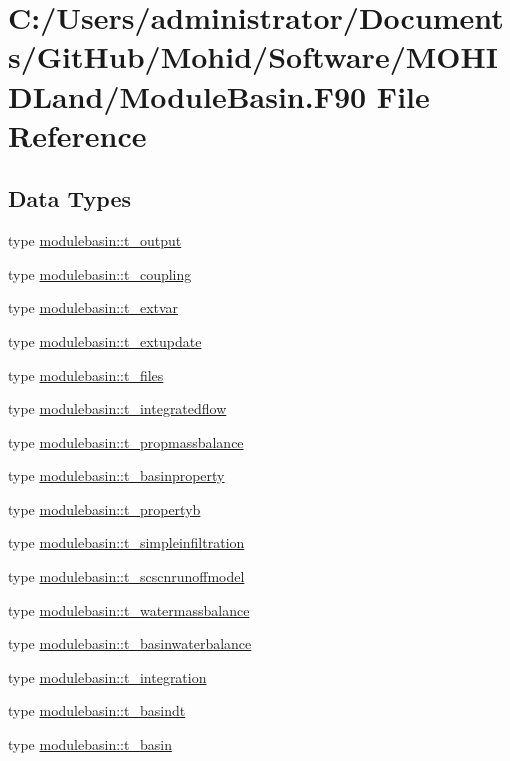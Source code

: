 \hypertarget{_module_basin_8_f90}{}\section{C\+:/\+Users/administrator/\+Documents/\+Git\+Hub/\+Mohid/\+Software/\+M\+O\+H\+I\+D\+Land/\+Module\+Basin.F90 File Reference}
\label{_module_basin_8_f90}
\subsection*{Data Types}
\begin{DoxyCompactItemize}
\item 
type \mbox{\hyperlink{structmodulebasin_1_1t__output}{modulebasin\+::t\+\_\+output}}
\item 
type \mbox{\hyperlink{structmodulebasin_1_1t__coupling}{modulebasin\+::t\+\_\+coupling}}
\item 
type \mbox{\hyperlink{structmodulebasin_1_1t__extvar}{modulebasin\+::t\+\_\+extvar}}
\item 
type \mbox{\hyperlink{structmodulebasin_1_1t__extupdate}{modulebasin\+::t\+\_\+extupdate}}
\item 
type \mbox{\hyperlink{structmodulebasin_1_1t__files}{modulebasin\+::t\+\_\+files}}
\item 
type \mbox{\hyperlink{structmodulebasin_1_1t__integratedflow}{modulebasin\+::t\+\_\+integratedflow}}
\item 
type \mbox{\hyperlink{structmodulebasin_1_1t__propmassbalance}{modulebasin\+::t\+\_\+propmassbalance}}
\item 
type \mbox{\hyperlink{structmodulebasin_1_1t__basinproperty}{modulebasin\+::t\+\_\+basinproperty}}
\item 
type \mbox{\hyperlink{structmodulebasin_1_1t__propertyb}{modulebasin\+::t\+\_\+propertyb}}
\item 
type \mbox{\hyperlink{structmodulebasin_1_1t__simpleinfiltration}{modulebasin\+::t\+\_\+simpleinfiltration}}
\item 
type \mbox{\hyperlink{structmodulebasin_1_1t__scscnrunoffmodel}{modulebasin\+::t\+\_\+scscnrunoffmodel}}
\item 
type \mbox{\hyperlink{structmodulebasin_1_1t__watermassbalance}{modulebasin\+::t\+\_\+watermassbalance}}
\item 
type \mbox{\hyperlink{structmodulebasin_1_1t__basinwaterbalance}{modulebasin\+::t\+\_\+basinwaterbalance}}
\item 
type \mbox{\hyperlink{structmodulebasin_1_1t__integration}{modulebasin\+::t\+\_\+integration}}
\item 
type \mbox{\hyperlink{structmodulebasin_1_1t__basindt}{modulebasin\+::t\+\_\+basindt}}
\item 
type \mbox{\hyperlink{structmodulebasin_1_1t__basin}{modulebasin\+::t\+\_\+basin}}
\end{DoxyCompactItemize}
